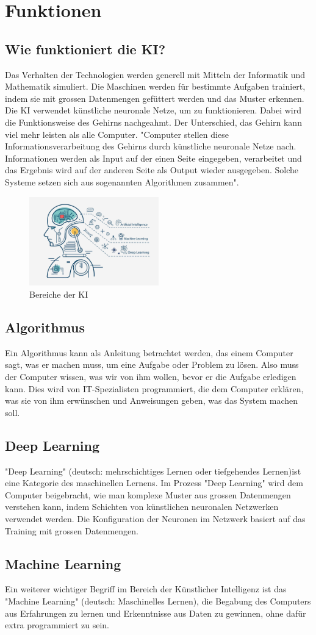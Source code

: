 \chapter{Funktionen}
\label{chap:methode}

\section{Wie funktioniert die KI?}
Das Verhalten der Technologien werden generell mit Mitteln der Informatik und Mathematik simuliert. Die Maschinen werden für bestimmte Aufgaben trainiert, indem sie mit grossen Datenmengen gefüttert werden und das Muster erkennen. Die KI verwendet künstliche neuronale Netze, um zu funktionieren. Dabei wird die Funktionsweise des Gehirns nachgeahmt. Der Unterschied, das Gehirn kann viel mehr leisten als alle Computer. "Computer stellen diese Informationsverarbeitung  des Gehirns durch künstliche neuronale Netze nach. Informationen werden als Input auf der einen Seite eingegeben, verarbeitet und das Ergebnis wird auf der anderen Seite als Output wieder ausgegeben. Solche Systeme setzen sich aus sogenannten Algorithmen zusammen"\citep{ai-genius-community}.

\begin{figure}[h]
    \centering
    \includegraphics[width=0.5\textwidth]{AI.jpeg} 
    \caption{Bereiche der KI}
    \label{fig:ai}
\end{figure}

\section{Algorithmus}
Ein Algorithmus kann als Anleitung betrachtet werden, das einem Computer sagt, was er machen muss, um eine Aufgabe oder Problem zu lösen. Also muss der Computer wissen, was wir von ihm wollen, bevor er die Aufgabe erledigen kann. Dies wird von IT-Spezialisten programmiert, die dem Computer erklären, was sie von ihm erwünschen und Anweisungen geben, was das System machen soll.

\section{Deep Learning}
"Deep Learning" (deutsch: mehrschichtiges Lernen oder tiefgehendes Lernen)ist eine Kategorie des maschinellen Lernens.
Im Prozess "Deep Learning"   wird dem Computer beigebracht, wie man komplexe Muster aus grossen Datenmengen verstehen kann, indem Schichten von künstlichen neuronalen Netzwerken verwendet werden. Die Konfiguration der Neuronen im Netzwerk basiert auf das Training mit grossen Datenmengen.

\section{Machine Learning}
Ein weiterer wichtiger Begriff im Bereich der Künstlicher Intelligenz ist das "Machine Learning" (deutsch: Maschinelles Lernen), die Begabung des Computers aus Erfahrungen zu lernen und Erkenntnisse aus Daten zu gewinnen, ohne dafür extra programmiert zu sein.